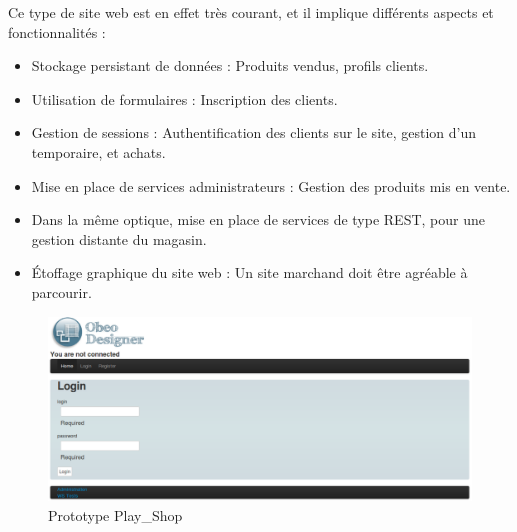Ce type de site web est en effet très courant, et il implique différents aspects et fonctionnalités : 
\begin{itemize}
\item Stockage persistant de données : Produits vendus, profils clients.
\item Utilisation de formulaires : Inscription des clients.
\item Gestion de sessions : Authentification des clients sur le site, gestion d'un  temporaire, et achats.
\item Mise en place de services administrateurs : Gestion des produits mis en vente.
\item Dans la même optique, mise en place de services de type REST, pour une gestion distante du magasin.
\item Étoffage graphique du site web : Un site marchand doit être agréable à parcourir.
\end{itemize}

\begin{figure}[htb]
  \centering
  \includegraphics[scale=.46]{img/proto.eps}
  \caption{Prototype Play\_Shop}
  \label{fig:pro}
\end{figure}





